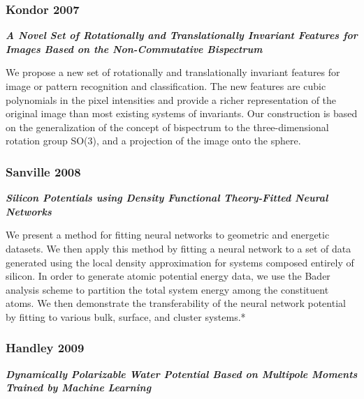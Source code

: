 \documentclass[11pt]{article}
\begin{document}
    \subsubsection{Kondor 2007}\label{kondor-2007}

\textbf{\emph{A Novel Set of Rotationally and Translationally Invariant
Features for Images Based on the Non-Commutative Bispectrum}}

We propose a new set of rotationally and translationally invariant
features for image or pattern recognition and classification. The new
features are cubic polynomials in the pixel intensities and provide a
richer representation of the original image than most existing systems
of invariants. Our construction is based on the generalization of the
concept of bispectrum to the three-dimensional rotation group SO(3), and
a projection of the image onto the sphere.

    \subsubsection{Sanville 2008}\label{sanville-2008}

\textbf{\emph{Silicon Potentials using Density Functional Theory-Fitted
Neural Networks}}

We present a method for fitting neural networks to geometric and
energetic datasets. We then apply this method by fitting a neural
network to a set of data generated using the local density approximation
for systems composed entirely of silicon. In order to generate atomic
potential energy data, we use the Bader analysis scheme to partition the
total system energy among the constituent atoms. We then demonstrate the
transferability of the neural network potential by fitting to various
bulk, surface, and cluster systems.*

    \subsubsection{Handley 2009}\label{handley-2009}

\textbf{\emph{Dynamically Polarizable Water Potential Based on Multipole
Moments Trained by Machine Learning}}
\end{document}
